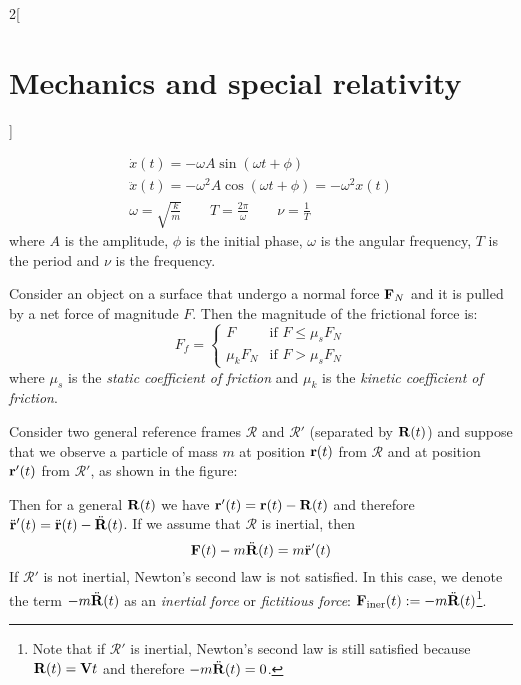 \documentclass[../../../main.tex]{subfiles}
\begin{document}
\begin{multicols}{2}[\section{Mechanics and special relativity}]
\begin{proposition}
\begin{gather*}
      \dot{x}(t)=-\omega A\sin(\omega t+\phi)\\
      \ddot{x}(t)=-\omega^2 A\cos(\omega t+\phi)=-\omega^2x(t)\\
      \omega=\sqrt{\frac{k}{m}}\qquad T=\frac{2\pi}{\omega}\qquad\nu=\frac{1}{T}
    \end{gather*}
    where $A$ is the amplitude, $\phi$ is the initial phase, $\omega$ is the angular frequency, $T$ is the period and $\nu$ is the frequency.
  \end{proposition}
  \begin{proposition}
    Consider an object on a surface that undergo a normal force $\boldsymbol{\mathrm{F}}_N$ and it is pulled by a net force of magnitude $F$. Then the magnitude of the frictional force is:
    $$
      F_f=
      \begin{cases}
        F        & \text{if }F\leq\mu_sF_N \\
        \mu_kF_N & \text{if }F>\mu_sF_N
      \end{cases}
    $$
    where $\mu_s$ is the \emph{static coefficient of friction} and $\mu_k$ is the \emph{kinetic coefficient of friction}.
  \end{proposition}
  \begin{proposition}
    Consider two general reference frames $\mathcal{R}$ and $\mathcal{R}'$ (separated by $\boldsymbol{\mathrm{R}}(t)$) and suppose that we observe a particle of mass $m$ at position $\boldsymbol{\mathrm{r}}(t)$ from $\mathcal{R}$ and at position $\boldsymbol{\mathrm{r}}'(t)$ from $\mathcal{R}'$, as shown in the figure:
    \begin{center}
      \begin{minipage}{\linewidth}
        \centering
        
      \end{minipage}
    \end{center}
    Then for a general $\boldsymbol{\mathrm{R}}(t)$ we have $\boldsymbol{\mathrm{r}}'(t)=\boldsymbol{\mathrm{r}}(t)-\boldsymbol{\mathrm{R}}(t)$ and therefore $\ddot{\boldsymbol{\mathrm{r}}}'(t)=\ddot{\boldsymbol{\mathrm{r}}}(t)-\ddot{\boldsymbol{\mathrm{R}}}(t)$. If we assume that $\mathcal{R}$ is inertial, then $$\boldsymbol{\mathrm{F}}(t)-m\ddot{\boldsymbol{\mathrm{R}}}(t)=m\ddot{\boldsymbol{\mathrm{r}}}'(t)$$ If $\mathcal{R}'$ is not inertial, Newton's second law is not satisfied. In this case, we denote the term $-m\ddot{\boldsymbol{\mathrm{R}}}(t)$ as an \emph{inertial force} or \emph{fictitious force}: $\boldsymbol{\mathrm{F}}_\text{iner}(t):=-m\ddot{\boldsymbol{\mathrm{R}}}(t)$\footnote{Note that if $\mathcal{R}'$ is inertial, Newton's second law is still satisfied because $\boldsymbol{\mathrm{R}}(t)=\boldsymbol{\mathrm{V}}t$ and therefore $-m\ddot{\boldsymbol{\mathrm{R}}}(t)=0$.}.
  \end{proposition}

\end{multicols}
\end{document}
